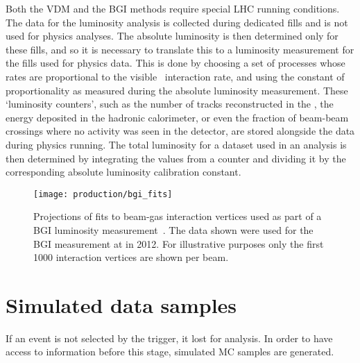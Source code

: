 Both the \ac{VDM} and the \ac{BGI} methods require special \ac{LHC} running 
conditions.
The data for the luminosity analysis is collected during dedicated fills and is 
not used for physics analyses.
The absolute luminosity is then determined only for these fills, and so it is 
necessary to translate this to a luminosity measurement for the fills used for 
physics data.
This is done by choosing a set of processes whose rates are proportional to the 
visible \pp\ interaction rate, and using the constant of proportionality as 
measured during the absolute luminosity measurement.
These `luminosity counters', such as the number of tracks reconstructed in the 
\velo, the energy deposited in the hadronic calorimeter, or even the fraction 
of beam-beam crossings where no activity was seen in the detector, are stored 
alongside the data during physics running.
The total luminosity for a dataset used in an analysis is then determined by 
integrating the values from a counter and dividing it by the corresponding 
absolute luminosity calibration constant.

\begin{figure}
  \centering
  \texttt{[image: production/bgi\_fits]}
  \caption{%
    Projections of fits to beam-gas interaction vertices used as part of a 
    \acl{BGI} luminosity measurement~\cite{LHCb-PAPER-2014-047}.
    The data shown were used for the \ac{BGI} measurement at  in 
    2012.
    For illustrative purposes only the first \num{1000} interaction vertices 
    are shown per beam.
  }
  \label{fig:prod:data:lumi:bgi_fits}
\end{figure}

\section{Simulated data samples}
\label{chap:prod:data:mc}

If an event is not selected by the trigger, it lost for analysis.
In order to have access to information before this stage, simulated \acf{MC} 
samples are generated.


